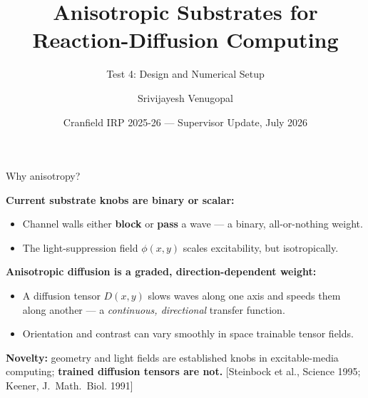 \documentclass[aspectratio=169,11pt]{beamer}
\title{Anisotropic Substrates for Reaction-Diffusion Computing}
\subtitle{Test 4: Design and Numerical Setup}
\author{Srivijayesh Venugopal}
\date{Cranfield IRP 2025-26 --- Supervisor Update, July 2026}
\newcommand{\citeslide}[1]{\hfill{\footnotesize [#1]}}
\begin{document}
\begin{frame}
\titlepage
\end{frame}

\begin{frame}{Why anisotropy?}

\textbf{Current substrate knobs are binary or scalar:}
\begin{itemize}
    \item Channel walls either \textbf{block} or \textbf{pass} a wave --- a binary, all-or-nothing weight.
    \item The light-suppression field $\phi(x,y)$ scales excitability, but isotropically.
\end{itemize}

\vspace{0.3cm}
\textbf{Anisotropic diffusion is a graded, direction-dependent weight:}
\begin{itemize}
    \item A diffusion tensor $D(x,y)$ slows waves along one axis and speeds them along another --- a \emph{continuous, directional} transfer function.
    \item Orientation and contrast can vary smoothly in space \textrightarrow{} trainable tensor fields.
\end{itemize}

\vspace{0.3cm}
\textbf{Novelty:} geometry and light fields are established knobs in excitable-media computing; \textbf{trained diffusion tensors are not.}
\citeslide{Steinbock et al., Science 1995; Keener, J.~Math.~Biol. 1991}

\end{frame}
\end{document}
